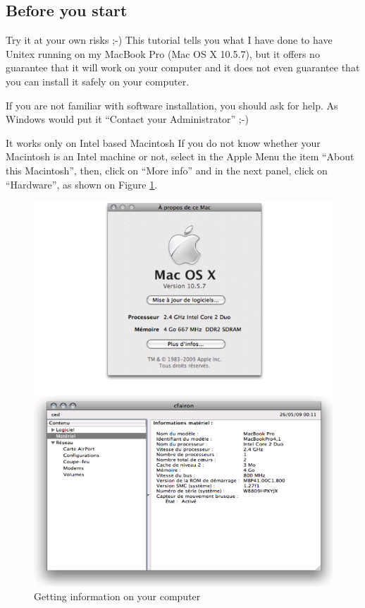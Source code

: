 \subsection{Before you start}
\noindent Try it at your own risks ;-) This tutorial tells you what I have done
to have Unitex running on my MacBook Pro (Mac OS X 10.5.7), but it offers no guarantee 
that it will work  on your computer and it does not even guarantee that you can 
install it safely on your computer.

\bigskip
\noindent If you are not familiar with software installation, you should ask for
help. As Windows would put it ``Contact your Administrator'' ;-) 

\bigskip
\noindent It works only on Intel based Macintosh If you do not know whether your 
Macintosh is an Intel machine or not, select in the Apple Menu the item 
``About this Macintosh'', then, click on ``More info'' and in the next panel,
click on ``Hardware'', as shown on Figure \ref{fig-mac1}.

\begin{figure}[!h]
\begin{center}
\includegraphics[width=13cm]{resources/img/fig-mac1.png}
\caption{Getting information on your computer\label{fig-mac1}}
\end{center}
\end{figure}

